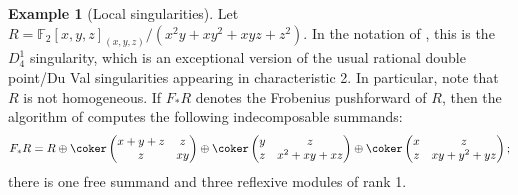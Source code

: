 \documentclass[12pt]{article}
\def\FF{\mathbb F}
\theoremstyle{theorem}
\numberwithin{thm}{section}
\theoremstyle{definition}
\newtheorem{exa}[thm]{Example}
\newcommand{\mahrud}[1]{{\color{ForestGreen} \sf $\blacklozenge$ Mahrud: [#1]}}
\begin{document}

\begin{exa}[Local singularities]
  Let $R = \FF_2[x,y,z]_{(x,y,z)}/(x^2y+xy^2+xyz+z^2)$. In the notation of \cite{Artin77}, this is the $D_4^1$ singularity, which is an exceptional version of the usual rational double point/Du Val singularities appearing in characteristic 2.  In particular, note that $R$ is not homogeneous. If $F_* R$ denotes the Frobenius pushforward of $R$, then the algorithm of  computes the following indecomposable summands:
  $$
  F_*R = R\oplus
  \coker
  \begin{pmatrix}
    x+y+z&z\\
    z&xy
  \end{pmatrix}\oplus\coker \begin{pmatrix}
    y&z\\
    z&x^{2}+xy+xz
  \end{pmatrix}\oplus \coker\begin{pmatrix}
  x&z\\
  z&xy+y^{2}+yz
  \end{pmatrix};
  $$
  there is one free summand and three reflexive modules of rank 1.
\end{exa}
\end{document}

